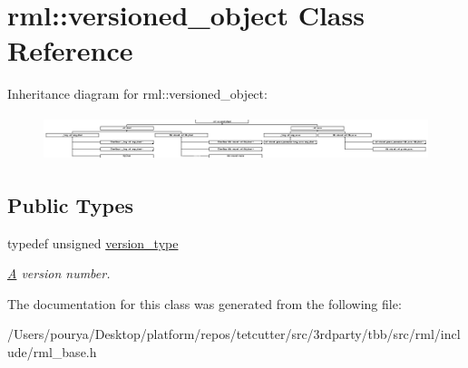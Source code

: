 \hypertarget{classrml_1_1versioned__object}{}\section{rml\+:\+:versioned\+\_\+object Class Reference}
\label{classrml_1_1versioned__object}
Inheritance diagram for rml\+:\+:versioned\+\_\+object\+:\begin{figure}[H]
\begin{center}
\leavevmode
\includegraphics[height=1.322314cm]{classrml_1_1versioned__object}
\end{center}
\end{figure}
\subsection*{Public Types}
\begin{DoxyCompactItemize}
\item 
\hypertarget{classrml_1_1versioned__object_a759650010b271238ef9433442730c423}{}typedef unsigned \hyperlink{classrml_1_1versioned__object_a759650010b271238ef9433442730c423}{version\+\_\+type}\label{classrml_1_1versioned__object_a759650010b271238ef9433442730c423}

\begin{DoxyCompactList}\small\item\em \hyperlink{structA}{A} version number. \end{DoxyCompactList}\end{DoxyCompactItemize}


The documentation for this class was generated from the following file\+:\begin{DoxyCompactItemize}
\item 
/\+Users/pourya/\+Desktop/platform/repos/tetcutter/src/3rdparty/tbb/src/rml/include/rml\+\_\+base.\+h\end{DoxyCompactItemize}
